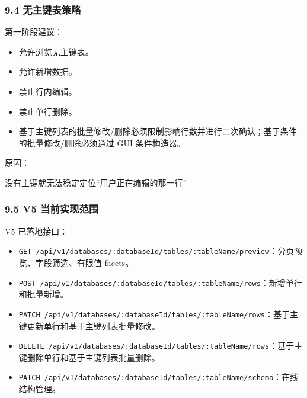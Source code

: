\documentclass[
  a4paper,
  UTF8]{ctexart}
\newenvironment{Shaded}{}{}
\newcommand{\NormalTok}[1]{#1}
\providecommand{\tightlist}{%
  \setlength{\itemsep}{0pt}\setlength{\parskip}{0pt}}
\begin{document}
\hypertarget{ux65e0ux4e3bux952eux8868ux7b56ux7565}{%
\subsubsection{9.4
无主键表策略}\label{ux65e0ux4e3bux952eux8868ux7b56ux7565}}

第一阶段建议：

\begin{itemize}
\tightlist
\item
  允许浏览无主键表。
\item
  允许新增数据。
\item
  禁止行内编辑。
\item
  禁止单行删除。
\item
  基于主键列表的批量修改/删除必须限制影响行数并进行二次确认；基于条件的批量修改/删除必须通过
  GUI 条件构造器。
\end{itemize}

原因：

\begin{Shaded}
\begin{Highlighting}[]
\NormalTok{没有主键就无法稳定定位“用户正在编辑的那一行”}
\end{Highlighting}
\end{Shaded}

\hypertarget{v5-ux5f53ux524dux5b9eux73b0ux8303ux56f4}{%
\subsubsection{9.5 V5
当前实现范围}\label{v5-ux5f53ux524dux5b9eux73b0ux8303ux56f4}}

V5 已落地接口：

\begin{itemize}
\tightlist
\item
  \texttt{GET\ /api/v1/databases/:databaseId/tables/:tableName/preview}：分页预览、字段筛选、有限值
  facets。
\item
  \texttt{POST\ /api/v1/databases/:databaseId/tables/:tableName/rows}：新增单行和批量新增。
\item
  \texttt{PATCH\ /api/v1/databases/:databaseId/tables/:tableName/rows}：基于主键更新单行和基于主键列表批量修改。
\item
  \texttt{DELETE\ /api/v1/databases/:databaseId/tables/:tableName/rows}：基于主键删除单行和基于主键列表批量删除。
\item
  \texttt{PATCH\ /api/v1/databases/:databaseId/tables/:tableName/schema}：在线结构管理。
\end{itemize}
\end{document}
